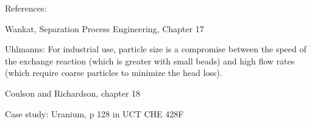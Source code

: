 References:

Wankat, Separation Process Engineering, Chapter 17

Uhlmanns: For industrial use, particle size is a compromise between the speed of the exchange reaction (which is greater with small beads) and high flow rates (which require coarse particles to minimize the head loss).


Coulson and Richardson, chapter 18

Case study: Uranium, p 128 in UCT CHE 428F